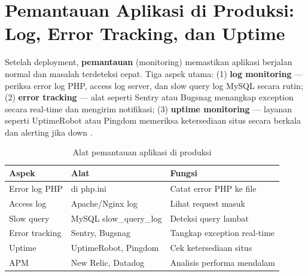 ﻿\section{Pemantauan Aplikasi di Produksi: Log, Error Tracking, dan Uptime}

Setelah deployment, \textbf{pemantauan} (monitoring) memastikan aplikasi berjalan normal dan masalah terdeteksi cepat. Tiga aspek utama: (1) \textbf{log monitoring} --- periksa error log PHP, access log server, dan slow query log MySQL secara rutin; (2) \textbf{error tracking} --- alat seperti Sentry atau Bugsnag menangkap exception secara real-time dan mengirim notifikasi; (3) \textbf{uptime monitoring} --- layanan seperti UptimeRobot atau Pingdom memeriksa ketersediaan situs secara berkala dan alerting jika down \cite{mdnDeploy}.

\begin{table}[H]
\centering
\begin{tabular}{|P{3cm}|P{4.5cm}|P{5cm}|}
\hline
\textbf{Aspek} & \textbf{Alat} & \textbf{Fungsi} \\
\hline
Error log PHP &  di php.ini & Catat error PHP ke file \\
\hline
Access log & Apache/Nginx log & Lihat request masuk \\
\hline
Slow query & MySQL slow\_query\_log & Deteksi query lambat \\
\hline
Error tracking & Sentry, Bugsnag & Tangkap exception real-time \\
\hline
Uptime & UptimeRobot, Pingdom & Cek ketersediaan situs \\
\hline
APM & New Relic, Datadog & Analisis performa mendalam \\
\hline
\end{tabular}
\caption{Alat pemantauan aplikasi di produksi}
\end{table}

